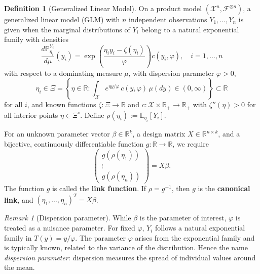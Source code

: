 \documentclass[a4paper,12pt, oneside, fleqn]{book}
\theoremstyle{definition}
\newtheorem{definition}{Definition}[section]
\theoremstyle{remark}
\newtheorem*{remark}{Remark}
\begin{document}
\begin{definition}[Generalized Linear Model]
On a product model $(\mathcal{X}^n, \mathcal{F}^{\otimes n})$, a generalized linear model (GLM) with $n$ independent observations $Y_1, \dots, Y_n$ is given when the marginal distributions of $Y_i$ belong to a natural exponential family with densities
\begin{equation}
	\frac{d\mathbb{P}_{\eta_i}^{Y_i}}{d\mu}(y_i) = \exp\left(\frac{\eta_i y_i - \zeta(\eta_i)}{\varphi}\right) c(y_i, \varphi), \quad i = 1, \dots, n
\end{equation}
with respect to a dominating measure $\mu$, with dispersion parameter $\varphi > 0$,
\begin{equation*}
	\eta_i \in \Xi = \left\{ \eta \in \mathbb{R} : \int_{\mathcal{X}} e^{\eta y / \varphi}\, c(y, \varphi)\, \mu(dy) \in (0, \infty) \right\} \subset \mathbb{R}
\end{equation*}
for all $i$, and known functions $\zeta \colon \Xi \to \mathbb{R}$ and $c \colon \mathcal{X} \times \mathbb{R}_+ \to \mathbb{R}_+$ with $\zeta''(\eta) > 0$ for all interior points $\eta \in \Xi^\circ$. Define $\rho(\eta_i) := \mathbb{E}_{\eta_i}[Y_i]$.

For an unknown parameter vector $\beta \in \mathbb{R}^k$, a design matrix $X \in \mathbb{R}^{n \times k}$, and a bijective, continuously differentiable function $g \colon \mathbb{R} \to \mathbb{R}$, we require
\begin{equation}
	\begin{pmatrix} g(\rho(\eta_1)) \\ \vdots \\ g(\rho(\eta_n)) \end{pmatrix} = X\beta.
\end{equation}
The function $g$ is called the \textbf{link function}. If $\rho = g^{-1}$, then $g$ is the \textbf{canonical link}, and $(\eta_1, \dots, \eta_n)^T = X\beta$.
\end{definition}

\begin{remark}[Dispersion parameter]
While $\beta$ is the parameter of interest, $\varphi$ is treated as a nuisance parameter. For fixed $\varphi$, $Y_i$ follows a natural exponential family in $T(y) = y/\varphi$. The parameter $\varphi$ arises from the exponential family and is typically known, related to the variance of the distribution. Hence the name \emph{dispersion parameter}: dispersion measures the spread of individual values around the mean.
\end{remark}
\end{document}
